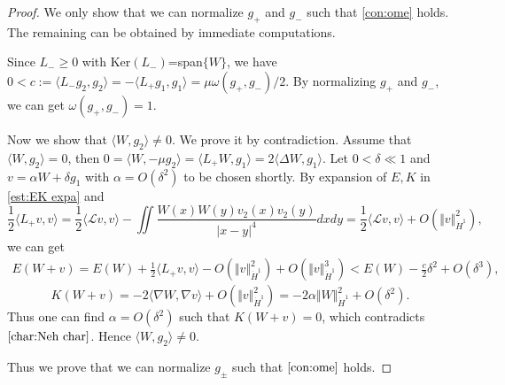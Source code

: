 \documentclass[reqno, 11pt]{amsart}
\numberwithin{equation}{section}
\theoremstyle{plain}
\theoremstyle{definition}
\numberwithin{equation}{section}
\numberwithin{theorem}{section}
\numberwithin{equation}{section}
\numberwithin{equation}{section}
\numberwithin{theorem}{section}
\begin{document}
	\begin{proof}
		We only show that we can normalize $g_+$ and $g_-$ such that  \eqref{con:ome} holds. The remaining can be obtained by immediate computations.
		
		Since $L_-\geq0$ with Ker$(L_-)$=span$\{W\}$, we have
		$0<c:=\langle L_{-}g_2,g_2 \rangle=-\langle L_{+}g_1,g_1 \rangle=\mu\omega(g_+,g_-)/2$. By normalizing $g_+$ and $g_-$, we can get $\omega(g_+,g_-)=1$.
		
		Now we show that $\langle W,g_2 \rangle\neq0$. We prove it by contradiction. Assume that $\langle W,g_2\rangle=0$, then $0=\langle W,-\mu g_2\rangle=\langle L_+W,g_1\rangle=2\langle \Delta W,g_1\rangle$. Let $0<\delta\ll1$ and $v=\alpha W+\delta g_1$ with $\alpha=O(\delta^2)$ to be chosen shortly. By expansion of $E,K$ in \eqref{est:EK expa} and
		\begin{equation*}
		\frac{1}{2}\langle L_+v,v\rangle=\frac{1}{2}\langle \mathcal{L}v,v\rangle-\iint \frac{W(x)W(y)v_2(x)v_2(y)}{|x-y|^4} dxdy=\frac{1}{2}\langle \mathcal{L}v,v\rangle+O(\Vert v\Vert_{\dot H^1}^2),
		\end{equation*}
		we can get 
		\begin{equation*}
		\begin{aligned}
		E(W+v)=E(W)+\frac{1}{2}\langle L_+v,v\rangle-O(\Vert v\Vert_{\dot H^1}^2)+O(\Vert v\Vert_{\dot H^1}^3)<E(W)-\frac{c}{2}\delta^2+O(\delta^3),
		\end{aligned}
		\end{equation*}
		\begin{equation*}
		K(W+v)=-2\langle \nabla W,\nabla v\rangle+O(\Vert v\Vert_{\dot H^1}^2)=-2\alpha \Vert W\Vert_{\dot H^1}^2+O(\delta^2).
		\end{equation*}
		Thus one can find $\alpha=O(\delta^2)$ such that $K(W+v)=0$, which contradicts $\eqref{char:Neh char}$. Hence $\langle W,g_2\rangle\neq0$. 
		
		Thus we prove that we can normalize $g_\pm$ such that $\eqref{con:ome}$ holds. 
	\end{proof}
	
\end{document}
